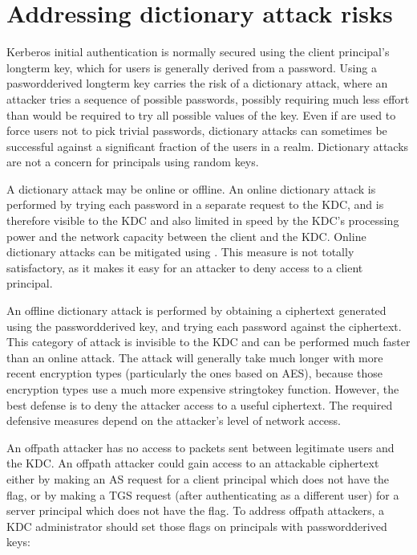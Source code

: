 \documentclass[letterpaper,10pt,english]{sphinxmanual}
\begin{document}
\chapter{Addressing dictionary attack risks}
\label{\detokenize{admin/dictionary:addressing-dictionary-attack-risks}}\label{\detokenize{admin/dictionary:dictionary}}\label{\detokenize{admin/dictionary::doc}}
\sphinxAtStartPar
Kerberos initial authentication is normally secured using the client
principal’s long\sphinxhyphen{}term key, which for users is generally derived from a
password.  Using a pasword\sphinxhyphen{}derived long\sphinxhyphen{}term key carries the risk of a
dictionary attack, where an attacker tries a sequence of possible
passwords, possibly requiring much less effort than would be required
to try all possible values of the key.  Even if {\hyperref[\detokenize{admin/database:policies}]{}} are used to force users not to pick trivial
passwords, dictionary attacks can sometimes be successful against a
significant fraction of the users in a realm.  Dictionary attacks are
not a concern for principals using random keys.

\sphinxAtStartPar
A dictionary attack may be online or offline.  An online dictionary
attack is performed by trying each password in a separate request to
the KDC, and is therefore visible to the KDC and also limited in speed
by the KDC’s processing power and the network capacity between the
client and the KDC.  Online dictionary attacks can be mitigated using
{\hyperref[\detokenize{admin/lockout:lockout}]{}}.  This measure is not totally
satisfactory, as it makes it easy for an attacker to deny access to a
client principal.

\sphinxAtStartPar
An offline dictionary attack is performed by obtaining a ciphertext
generated using the password\sphinxhyphen{}derived key, and trying each password
against the ciphertext.  This category of attack is invisible to the
KDC and can be performed much faster than an online attack.  The
attack will generally take much longer with more recent encryption
types (particularly the ones based on AES), because those encryption
types use a much more expensive string\sphinxhyphen{}to\sphinxhyphen{}key function.  However, the
best defense is to deny the attacker access to a useful ciphertext.
The required defensive measures depend on the attacker’s level of
network access.

\sphinxAtStartPar
An off\sphinxhyphen{}path attacker has no access to packets sent between legitimate
users and the KDC.  An off\sphinxhyphen{}path attacker could gain access to an
attackable ciphertext either by making an AS request for a client
principal which does not have the  flag, or by
making a TGS request (after authenticating as a different user) for a
server principal which does not have the  flag.  To
address off\sphinxhyphen{}path attackers, a KDC administrator should set those flags
on principals with password\sphinxhyphen{}derived keys:
\end{document}
